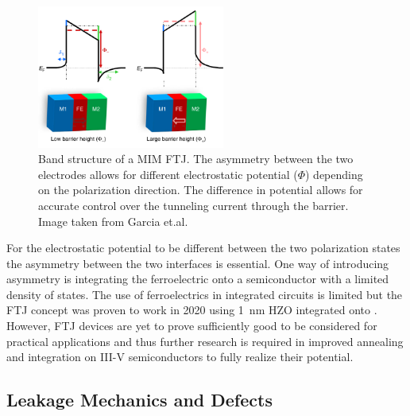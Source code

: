 \documentclass[11pt,twoside]{eitExjobb}
\begin{document}
\begin{figure}[htbp]
    \centering
    \includegraphics[width=0.55\textwidth]{fig/img/FTJbandstructure.png}
    \caption{Band structure of a MIM FTJ. The asymmetry between the two
        electrodes allows for different electrostatic potential ($\Phi$)
        depending on the polarization direction. The difference in potential
        allows for accurate control over the tunneling current through the
        barrier. Image taken from Garcia et.al. \cite{garcia2014ferroelectric}}
    \label{fig:theo_FTJband}
\end{figure}

For the electrostatic potential to be different between the two polarization
states the asymmetry between the two interfaces is essential. One way of
introducing asymmetry is integrating the ferroelectric onto a semiconductor
with a limited density of states. The use of ferroelectrics in integrated
circuits is limited but the FTJ concept was proven to work in 2020 using
\SI{1}{\nano\meter} HZO integrated onto  \cite{cheema2020one,
mikolajick2020past}. However, FTJ devices are yet to prove sufficiently good to
be considered for practical applications and thus further research is required
in improved annealing and integration on III-V semiconductors to fully realize
their potential.

\subsection{Leakage Mechanics and Defects}\label{sec:leakage}
\end{document}
